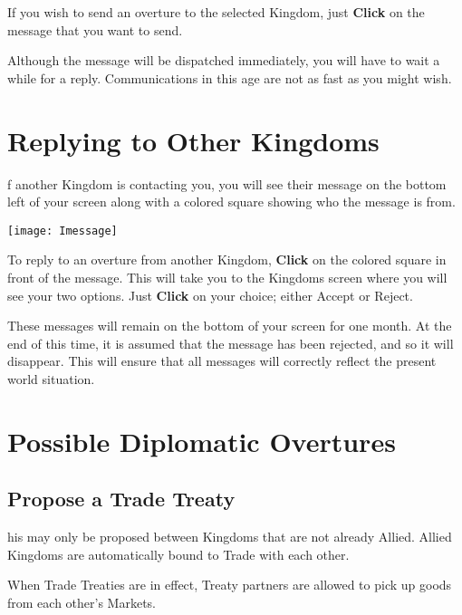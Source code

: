 If you wish to send an overture to the selected Kingdom, just \textbf{Click} on the message that you want to send.

Although the message will be dispatched immediately, you will have to wait a while for a reply. Communications in this age are not as fast as you might wish.

\section{Replying to Other Kingdoms}


f another Kingdom is contacting you, you will see their message on the bottom left of your screen along with a colored square showing who the message is from.

\begin{center}
    \texttt{[image: Imessage]} %
\end{center}

To reply to an overture from another Kingdom, \textbf{Click} on the colored square in front of the message. This will take you to the Kingdoms screen where you will see your two options. Just \textbf{Click} on your choice; either Accept or Reject.

These messages will remain on the bottom of your screen for one month. At the end of this time, it is assumed that the message has been rejected, and so it will disappear. This will ensure that all messages will correctly reflect the present world situation.

\section{Possible Diplomatic Overtures}


\subsection{Propose a Trade Treaty}


his may only be proposed between Kingdoms that are not already Allied. Allied Kingdoms are automatically bound to Trade with each other.

When Trade Treaties are in effect, Treaty partners are allowed to pick up goods from each other’s Markets.

